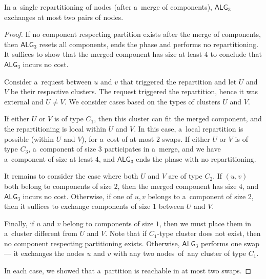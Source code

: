 \documentclass[a4paper,anonymous,USenglish]{lipics-v2019}
\newcommand{\TAlg}{{\ensuremath{\textsf{ALG}_{3}}}\xspace}
\begin{document}
\begin{lemma}
	\label{lem:1req}
	In a~single repartitioning of nodes (after a~merge of components), \TAlg exchanges at most two pairs of nodes.
\end{lemma}

\begin{proof}
	If no component respecting partition exists after the merge of components, then \TAlg resets all components, ends the phase and performs no repartitioning.
	It suffices to show that the merged component has size at least $4$ to conclude that \TAlg incurs no cost.
	
	
	Consider a~request between $u$ and $v$ that triggered the repartition and let $U$ and $V$ be their respective clusters.
	The request triggered the repartition, hence it was external and $U\neq V$.
	We consider cases based on the types of clusters $U$ and $V$.
	
	If either $U$ or $V$ is of type $C_1$, then this cluster can fit the merged component, and the repartitioning is local within $U$ and $V$.
	In this case, a~local repartition is possible (within $U$ and $V$), for a~cost of at most $2$ swaps.
	If either $U$ or $V$ is of type $C_3$, a~component of size $3$ participates in a~merge, and we have a~component of size at least $4$, and \TAlg ends the phase with no repartitioning.
	
	
	It remains to consider the case where both $U$ and $V$ are of type $C_2$.
	If $(u,v)$ both belong to components of size $2$, then the merged component has size $4$, and \TAlg incurs no cost. 
	Otherwise, if one of $u,v$ belongs to a~component of size $2$, then it suffices to exchange components of size $1$ between $U$ and $V$.

	Finally, if $u$ and $v$ belong to components of size $1$, then we must place them in a~cluster different from $U$ and $V$.
	Note that if $C_1$-type cluster does not exist, then no component respecting partitioning exists.
	Otherwise, \TAlg performs one swap --- it exchanges the nodes $u$ and $v$ with any two nodes~of~any cluster of type $C_1$.

	In each case, we showed that a~partition is reachable in at most two swaps.
\end{proof}
\end{document}

